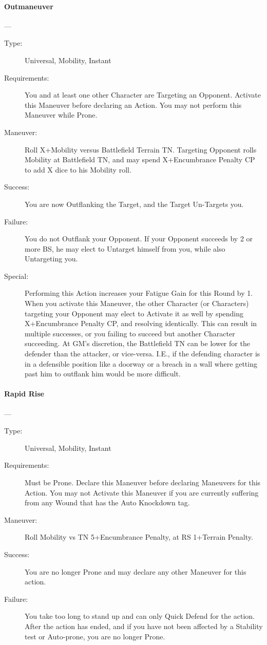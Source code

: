 \documentclass[oneside,11pt,english]{book}
\begin{document}
\paragraph{\large\label{man:Outmaneuver}Outmaneuver}---
\vspace{-10pt}\begin{description} 
\item [Type:] Universal, Mobility, Instant 
\item [Requirements:] You and at least one other Character are Targeting an Opponent. Activate this Maneuver 
before declaring an Action. You may not perform this Maneuver while Prone. 
\item [Maneuver:] Roll X+Mobility versus Battlefield Terrain TN. Targeting Opponent rolls Mobility at 
Battlefield TN, and may spend X+Encumbrance Penalty CP to add X dice to his Mobility roll. 
\item [Success:] You are now Outflanking the Target, and the Target Un-Targets you. 
\item [Failure:] You do not Outflank your Opponent. If your Opponent succeeds by 2 or more BS, he may elect 
to Untarget himself from you, while also Untargeting you. 
\item [Special:] Performing this Action increases your Fatigue Gain for this Round by 1. 
When you activate this Maneuver, the other Character (or Characters) targeting your Opponent may elect 
to Activate it as well by spending X+Encumbrance Penalty CP, and resolving identically. This can result 
in multiple successes, or you failing to succeed but another Character succeeding. 
At GM’s discretion, the Battlefield TN can be lower for the defender than the attacker, or vice-versa. I.E., 
if the defending character is in a defensible position like a doorway or a breach in a wall where getting 
past him to outflank him would be more difficult. 
\end{description}
\paragraph{\large\label{man:Rapid Rise}Rapid Rise}---
\vspace{-10pt}\begin{description} 
\item [Type:] Universal, Mobility, Instant 
\item [Requirements:] Must be Prone. Declare this Maneuver before declaring Maneuvers for this Action. You 
may not Activate this Maneuver if you are currently suffering from any Wound that has the Auto 
Knockdown tag. 
\item [Maneuver:] Roll Mobility vs TN 5+Encumbrance Penalty, at RS 1+Terrain Penalty. 
\item [Success:] You are no longer Prone and may declare any other Maneuver for this action. 
\item [Failure:] You take too long to stand up and can only Quick Defend for the action. After the action has 
ended, and if you have not been affected by a Stability test or Auto-prone, you are no longer Prone.
\end{description}
\end{document}

